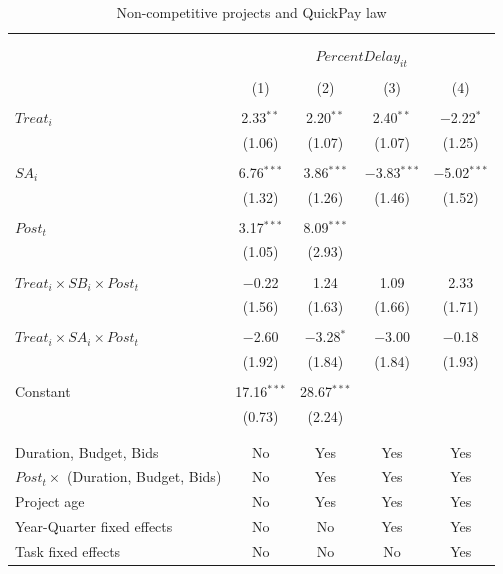 \documentclass[
]{article}
\begin{document}
\begin{table}[H] \centering 
  \caption{Non-competitive projects and QuickPay law} 
  \label{} 
\small 
\begin{tabular}{@{\extracolsep{-2pt}}lcccc} 
\\[-1.8ex]\hline 
\hline \\[-1.8ex] 
\\[-1.8ex] & \multicolumn{4}{c}{$PercentDelay_{it}$  } \\ 
\\[-1.8ex] & (1) & (2) & (3) & (4)\\ 
\hline \\[-1.8ex] 
 $Treat_i$ & 2.33$^{**}$ & 2.20$^{**}$ & 2.40$^{**}$ & $-$2.22$^{*}$ \\ 
  & (1.06) & (1.07) & (1.07) & (1.25) \\ 
  & & & & \\ 
 $SA_i$ & 6.76$^{***}$ & 3.86$^{***}$ & $-$3.83$^{***}$ & $-$5.02$^{***}$ \\ 
  & (1.32) & (1.26) & (1.46) & (1.52) \\ 
  & & & & \\ 
 $Post_t$ & 3.17$^{***}$ & 8.09$^{***}$ &  &  \\ 
  & (1.05) & (2.93) &  &  \\ 
  & & & & \\ 
 $Treat_i \times SB_i \times Post_t$ & $-$0.22 & 1.24 & 1.09 & 2.33 \\ 
  & (1.56) & (1.63) & (1.66) & (1.71) \\ 
  & & & & \\ 
 $Treat_i \times SA_i \times Post_t$ & $-$2.60 & $-$3.28$^{*}$ & $-$3.00 & $-$0.18 \\ 
  & (1.92) & (1.84) & (1.84) & (1.93) \\ 
  & & & & \\ 
 Constant & 17.16$^{***}$ & 28.67$^{***}$ &  &  \\ 
  & (0.73) & (2.24) &  &  \\ 
  & & & & \\ 
\hline \\[-1.8ex] 
Duration, Budget, Bids & No & Yes & Yes & Yes \\ 
$Post_t \times $  (Duration, Budget, Bids) & No & Yes & Yes & Yes \\ 
Project age & No & Yes & Yes & Yes \\ 
Year-Quarter fixed effects & No & No & Yes & Yes \\ 
Task fixed effects & No & No & No & Yes \\ 

\end{tabular}
\end{table}
\end{document}
